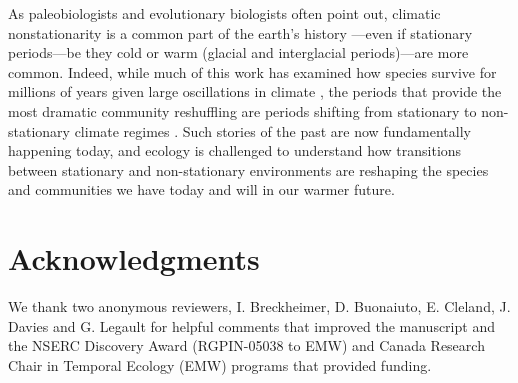 \documentclass[11pt,letterpaper]{article}
\begin{document}
As paleobiologists and evolutionary biologists often point out, climatic nonstationarity is a common part of the earth's history \citep{Jansson:2002nz}---even if stationary periods---be they cold or warm (glacial and interglacial periods)---are more common. Indeed, while much of this work has examined how species survive for millions of years given large oscillations in climate \citep{provan2008}, the periods that provide the most dramatic community reshuffling are periods shifting from stationary to non-stationary climate regimes \citep{vrba1980,vrba1985}. Such stories of the past are now fundamentally happening today, and ecology is challenged to understand how transitions between stationary and non-stationary environments are reshaping the species and communities we have today and will in our warmer future. 

\section{Acknowledgments}
We thank two anonymous reviewers, I. Breckheimer, D. Buonaiuto, E. Cleland, J. Davies and G. Legault for helpful comments that improved the manuscript and the NSERC Discovery Award (RGPIN-05038 to EMW) and Canada Research Chair in Temporal Ecology (EMW) programs that provided funding. 


\end{document}
